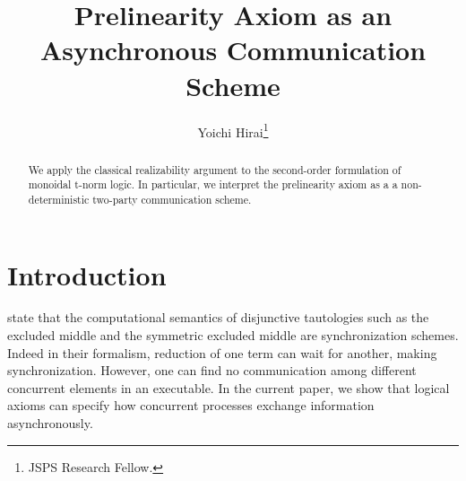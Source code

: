 \documentclass[envcountsame]{llncs}
\title{Prelinearity Axiom as an Asynchronous Communication Scheme}
\author{Yoichi Hirai\thanks{JSPS Research Fellow.}}
\institute{The University of Tokyo \email{yh@is.s.u-tokyo.ac.jp}}
\begin{document}
\maketitle
\begin{abstract}
 We apply the classical realizability argument to the second-order
 formulation of monoidal t-norm logic.
 In particular, we interpret the
 prelinearity axiom as a a non-deterministic two-party communication scheme.
\end{abstract}


\section{Introduction}
\citet{danos-krivine} state that
the computational semantics of disjunctive tautologies
such as the excluded middle and the symmetric excluded middle
are synchronization schemes.
Indeed in their formalism, reduction of one term can wait
for another, making synchronization.
However,
one can find no communication among different
concurrent elements in an executable.
In the current paper, we show that logical axioms can specify how
concurrent processes exchange information asynchronously.
\end{document}
